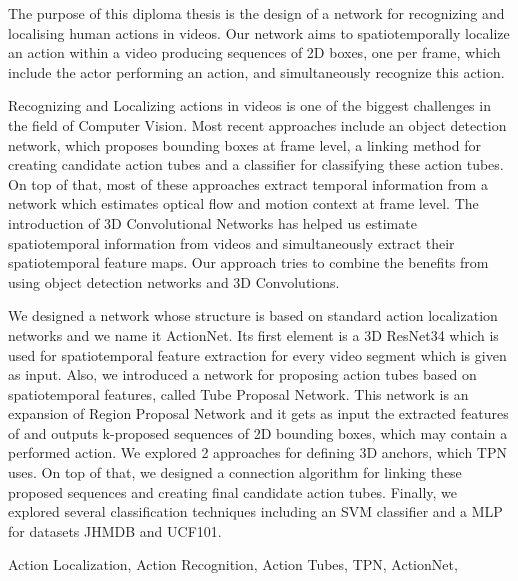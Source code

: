 \documentclass[10pt, twoside, a4paper]{cvsp-thesis-eng}
\newcommand{\en}{\selectlanguage{english}}
\begin{document}
\en
\begin{abstracteng}

  The purpose of this diploma thesis is the design of a network for recognizing and localising human actions in videos.
  Our network aims to spatiotemporally localize an  action within a video
  producing sequences of 2D boxes, one per frame, which include the actor
  performing an action, and simultaneously recognize this action. \par

  Recognizing and Localizing  actions in videos is one of the biggest
  challenges in the field of Computer Vision. Most recent approaches
  include an object detection network, which proposes bounding boxes at frame level,
  a linking method for creating candidate action tubes and
  a classifier for classifying these action tubes. On top of that, most of these
  approaches extract temporal information from a network which
  estimates optical flow and motion context at frame level. The introduction of 3D
  Convolutional Networks has helped us estimate spatiotemporal
  information from videos and simultaneously extract their spatiotemporal
  feature maps. Our approach tries to combine the benefits from using
  object detection networks and 3D Convolutions.\par

  We designed a network whose structure is based on standard action localization networks and we name it ActionNet. Its first
  element is a 3D ResNet34 which is used for spatiotemporal feature extraction for every video segment which is given as input.
  Also,   we introduced a network for proposing action tubes based on spatiotemporal features, called Tube Proposal Network.
  This network is an  expansion of Region Proposal Network and it gets as input the extracted features of and
  outputs k-proposed sequences of 2D bounding boxes, which may contain a performed action.
  We explored 2 approaches for  defining 3D anchors, which TPN uses. On top of that,   we designed a connection algorithm for
  linking these  proposed sequences and creating final candidate action tubes. Finally, we explored several classification techniques
  including an SVM classifier and a MLP for datasets JHMDB and UCF101.

\begin{keywordseng}
Action Localization, Action Recognition, Action Tubes, TPN, ActionNet,
\end{keywordseng}

\end{abstracteng}
\end{document}
